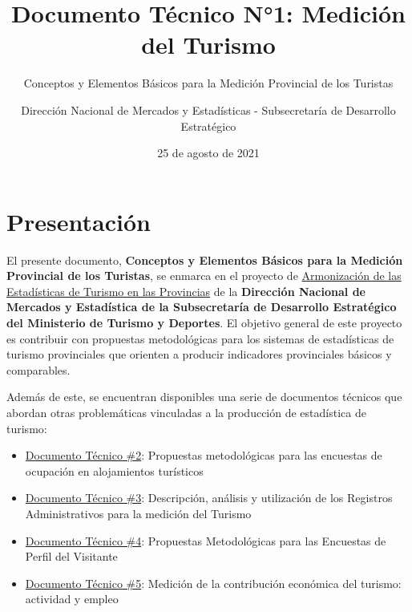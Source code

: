 \documentclass[
  openany]{book}
\title{Documento Técnico N°1: Medición del Turismo}
\subtitle{Conceptos y Elementos Básicos para la Medición Provincial de los Turistas}
\author{Dirección Nacional de Mercados y Estadísticas - Subsecretaría de Desarrollo Estratégico}
\date{25 de agosto de 2021}
\let\oldmaketitle\maketitle
\begin{document}
\maketitle


\newpage

\let\maketitle\oldmaketitle
\maketitle

{
\setcounter{tocdepth}{1}
\tableofcontents
}
\hypertarget{presentaciuxf3n}{%
\chapter*{Presentación}\label{presentaciuxf3n}}

El presente documento, \textbf{Conceptos y Elementos Básicos para la Medición Provincial de los Turistas}, se enmarca en el proyecto de \href{https://armonizacion.yvera.tur.ar//}{Armonización de las Estadísticas de Turismo en las Provincias} de la \textbf{Dirección Nacional de Mercados y Estadística de la Subsecretaría de Desarrollo Estratégico del Ministerio de Turismo y Deportes}. El objetivo general de este proyecto es contribuir con propuestas metodológicas para los sistemas de estadísticas de turismo provinciales que orienten a producir indicadores provinciales básicos y comparables.

Además de este, se encuentran disponibles una serie de documentos técnicos que abordan otras problemáticas vinculadas a la producción de estadística de turismo:

\begin{itemize}
\item
  \href{https://dnme-minturdep.github.io/DT2_encuestas/}{Documento Técnico \#2}: Propuestas metodológicas para las encuestas de ocupación en alojamientos turísticos
\item
  \href{https://dnme-minturdep.github.io/DT3_registros_adminsitrativos/}{Documento Técnico \#3}: Descripción, análisis y utilización de los Registros Administrativos para la medición del Turismo
\item
  \href{https://dnme-minturdep.github.io/DT4_perfiles/}{Documento Técnico \#4}: Propuestas Metodológicas para las Encuestas de Perfil del Visitante
\item
  \href{https://dnme-minturdep.github.io/DT5_actividad_empleo/}{Documento Técnico \#5}: Medición de la contribución económica del turismo: actividad y empleo
\end{itemize}
\end{document}
